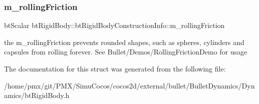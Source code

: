 \subsubsection{\texorpdfstring{m\+\_\+rolling\+Friction}{m\_rollingFriction}}
{\footnotesize\ttfamily bt\+Scalar bt\+Rigid\+Body\+::bt\+Rigid\+Body\+Construction\+Info\+::m\+\_\+rolling\+Friction}

the m\+\_\+rolling\+Friction prevents rounded shapes, such as spheres, cylinders and capsules from rolling forever. See Bullet/\+Demos/\+Rolling\+Friction\+Demo for usage 

The documentation for this struct was generated from the following file\+:\begin{DoxyCompactItemize}
\item 
/home/pmx/git/\+P\+M\+X/\+Simu\+Cocos/cocos2d/external/bullet/\+Bullet\+Dynamics/\+Dynamics/bt\+Rigid\+Body.\+h\end{DoxyCompactItemize}
